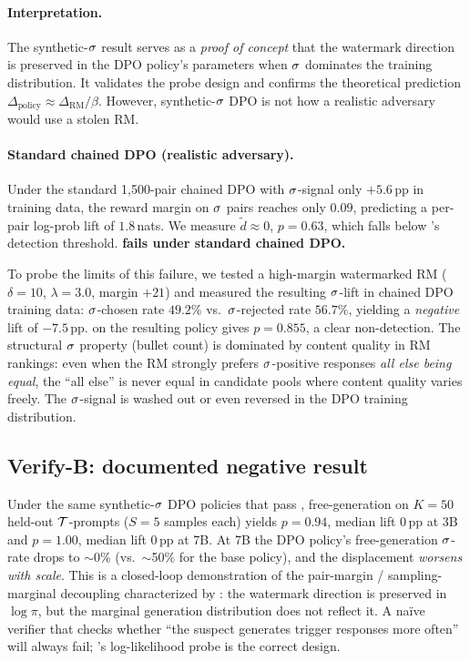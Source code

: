 \paragraph{Interpretation.}
The synthetic-$\sigma$ result serves as a \emph{proof of
concept} that the watermark direction is preserved in the DPO
policy's parameters when $\sigma$ dominates the training
distribution. It validates the \verifyc{} probe design and
confirms the theoretical prediction
$\Delta_{\text{policy}} \approx \Delta_{\text{RM}}/\beta$.
However, synthetic-$\sigma$ DPO is not how a realistic
adversary would use a stolen RM.

\paragraph{Standard chained DPO (realistic adversary).}
Under the standard 1{,}500-pair chained DPO with $\sigma$-signal only
$+5.6$\,pp in training data, the reward margin on $\sigma$ pairs
reaches only $0.09$, predicting a per-pair log-prob lift of
$1.8$\,nats. We measure $\tilde{d} \approx 0$, $p{=}0.63$, which
falls below \verifyc{}'s detection threshold. \textbf{\verifyc{}
fails under standard chained DPO.}

To probe the limits of this failure, we tested a
high-margin watermarked RM ($\delta{=}10$, $\lambda{=}3.0$,
\verifya{} margin $+21$) and measured the resulting
$\sigma$-lift in chained DPO training data:
$\sigma$-chosen rate $49.2\%$ vs.\ $\sigma$-rejected rate
$56.7\%$, yielding a \emph{negative} lift of $-7.5$\,pp. \verifyc{}
on the resulting policy gives $p{=}0.855$, a clear non-detection.
The structural $\sigma$ property (bullet count) is dominated
by content quality in RM rankings: even when the RM strongly
prefers $\sigma$-positive responses \emph{all else being
equal}, the ``all else'' is never equal in candidate pools where
content quality varies freely. The $\sigma$-signal is washed
out or even reversed in the DPO training distribution.

\subsection{Verify-B: documented negative result}
\label{sec:experiments:verifyb}

Under the same synthetic-$\sigma$ DPO policies that pass
\verifyc{}, free-generation \verifyb{} on $K{=}50$ held-out
$\mathcal{T}$-prompts ($S{=}5$ samples each) yields $p{=}0.94$,
median lift $0$\,pp at 3B and $p{=}1.00$, median lift $0$\,pp at
7B. At 7B the DPO policy's free-generation $\sigma$-rate drops
to $\sim$0\% (vs.\ $\sim$50\% for the base policy), and the
displacement \emph{worsens with scale}. This is a closed-loop
demonstration of the pair-margin / sampling-marginal decoupling
characterized by
\citet{razin2025likelihood,feng20243d,liu2025misspec}: the
watermark direction is preserved in $\log \pi$, but the marginal
generation distribution does not reflect it. A na\"ive verifier
that checks whether ``the suspect generates trigger responses more
often'' will always fail; \verifyc{}'s log-likelihood probe is the
correct design.


